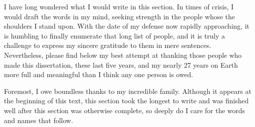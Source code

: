 \begin{acknowledgements}
I have long wondered what I would write in this section. 
In times of crisis, I would draft the words in my mind, seeking strength in the people whose the shoulders I stand upon. 
With the date of my defense now rapidly approaching, it is humbling to finally enumerate that long list of people, and it is truly a challenge to express my sincere gratitude to them in mere sentences. 
Nevertheless, please find below my best attempt at thanking those people who made this dissertation, these last five years, and my nearly 27 years on Earth more full and meaningful than I think any one person is owed.

Foremost, I owe boundless thanks to my incredible family. 
Although it appears at the beginning of this text, this section took the longest to write and was finished well after this section was otherwise complete, so deeply do I care for the words and names that follow. 


\end{acknowledgements}

